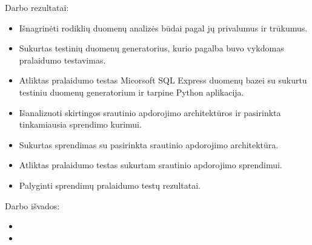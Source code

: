 \documentclass{VUMIFPSkursinis}
\begin{document}
Darbo rezultatai:
\begin{itemize}
    \item Išnagrinėti rodiklių duomenų analizės būdai pagal jų privalumus ir trūkumus.
    \item Sukurtas testinių duomenų generatorius, kurio pagalba buvo vykdomas pralaidumo testavimas.
    \item Atliktas pralaidumo testas Micorsoft SQL Express duomenų bazei su sukurtu testiniu duomenų generatorium ir tarpine Python aplikacija.
    \item Išanalizuoti skirtingos srautinio apdorojimo architektūros ir pasirinkta tinkamiausia sprendimo kurimui.  
    \item Sukurtas sprendimas su pasirinkta srautinio apdorojimo architektūra.
    \item Atliktas pralaidumo testas sukurtam srautinio apdorojimo sprendimui.
    \item Palyginti sprendimų pralaidumo testų rezultatai.   
\end{itemize}

Darbo išvados:
\begin{itemize}
\item 
\item
\end{itemize}

\printbibliography[heading=bibintoc] 
\end{document}
